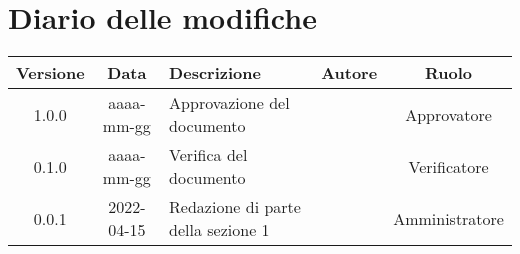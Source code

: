 \section*{Diario delle modifiche}
	\begin{center}
	\renewcommand{\arraystretch}{1.8} %
	\begin{tabular}{ |c|c|m{12em}|m{7em}|c| }
		\hline
		\textbf{Versione} & \textbf{Data} & \textbf{Descrizione} &  \textbf{Autore} &  \textbf{Ruolo} \\
		\hline
		1.0.0 & aaaa-mm-gg & Approvazione del documento & \docApprovazione & Approvatore\\
		\hline
		0.1.0 & aaaa-mm-gg & Verifica del documento & \docVerificatori & Verificatore\\
		\hline
		0.0.1 & 2022-04-15 & Redazione di parte della sezione 1 & \docRedattori & Amministratore\\
		\hline
	\end{tabular}
	\end{center}
	\newpage